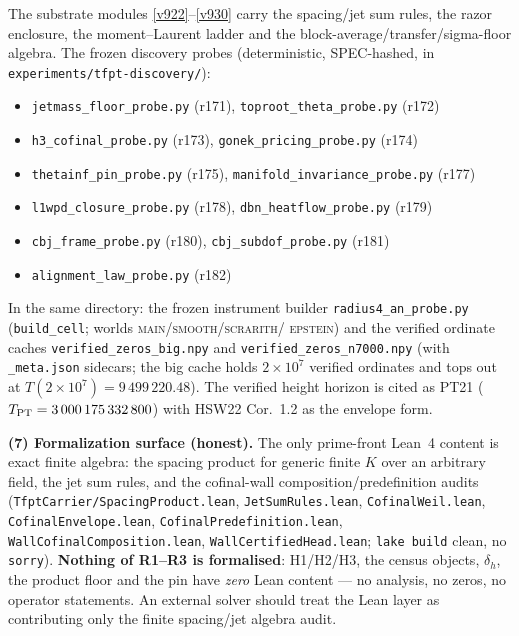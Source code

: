 \documentclass[11pt,a4paper]{article}
\begin{document}
The substrate modules \vref{v922}--\vref{v930} carry the spacing/jet sum rules, the razor
enclosure, the moment--Laurent ladder and the block-average/transfer/sigma-floor algebra.  The
frozen discovery probes (deterministic, SPEC-hashed, in
\texttt{experiments/tfpt-discovery/}):
\begin{itemize}
\item \texttt{jetmass\_floor\_probe.py} (r171), \texttt{toproot\_theta\_probe.py} (r172)
\item \texttt{h3\_cofinal\_probe.py} (r173), \texttt{gonek\_pricing\_probe.py} (r174)
\item \texttt{thetainf\_pin\_probe.py} (r175), \texttt{manifold\_invariance\_probe.py} (r177)
\item \texttt{l1wpd\_closure\_probe.py} (r178), \texttt{dbn\_heatflow\_probe.py} (r179)
\item \texttt{cbj\_frame\_probe.py} (r180), \texttt{cbj\_subdof\_probe.py} (r181)
\item \texttt{alignment\_law\_probe.py} (r182)
\end{itemize}
In the same directory: the frozen instrument
builder \texttt{radius4\_an\_probe.py} (\texttt{build\_cell}; worlds
\textsc{main}/\allowbreak\textsc{smooth}/\allowbreak\textsc{scrarith}/\allowbreak
\textsc{epstein}) and the verified ordinate caches \texttt{verified\_zeros\_big.npy} and
\texttt{verified\_zeros\_n7000.npy} (with \texttt{\_meta.json} sidecars; the big cache holds
$2\times10^{7}$ verified ordinates and tops out at $T(2\times10^{7}) = 9\,499\,220.48$).
The verified height horizon is cited as PT21
($T_{\rm PT} = 3\,000\,175\,332\,800$) with HSW22 Cor.~1.2 as the envelope form.

\par\smallskip\noindent\textbf{(7) Formalization surface (honest).}  The only prime-front
Lean~4 content is exact finite algebra: the spacing product for generic finite $K$ over an
arbitrary field, the jet sum rules, and the cofinal-wall composition/predefinition audits
(\texttt{TfptCarrier/SpacingProduct.lean}, \texttt{JetSumRules.lean},
\texttt{CofinalWeil.lean}, \texttt{CofinalEnvelope.lean}, \texttt{CofinalPredefinition.lean},
\texttt{WallCofinalComposition.lean}, \texttt{WallCertifiedHead.lean}; \texttt{lake build}
clean, no \texttt{sorry}).  \textbf{Nothing of R1--R3 is formalised}: H1/H2/H3, the census
objects, $\delta_h$, the product floor and the pin have \emph{zero} Lean content --- no
analysis, no zeros, no operator statements.  An external solver should treat the Lean layer as
contributing only the finite spacing/jet algebra audit.
\end{document}

